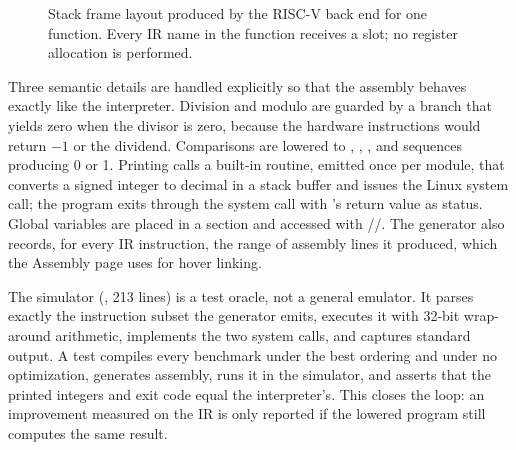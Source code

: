\begin{figure}[!htb]
\centering
{}
\caption[Stack frame layout produced by the RISC-V back end for one function.]{Stack frame layout produced by the RISC-V back end for one function. Every IR name in the function receives a slot; no register allocation is performed.}
\label{fig:frame}
\end{figure}

Three semantic details are handled explicitly so that the assembly behaves exactly like the interpreter. Division and modulo are guarded by a branch that yields zero when the divisor is zero, because the hardware instructions would return $-1$ or the dividend. Comparisons are lowered to , , , and  sequences producing 0 or 1. Printing calls a built-in  routine, emitted once per module, that converts a signed integer to decimal in a stack buffer and issues the Linux  system call; the program exits through the  system call with 's return value as status. Global variables are placed in a  section and accessed with //. The generator also records, for every IR instruction, the range of assembly lines it produced, which the Assembly page uses for hover linking.

The simulator (, 213 lines) is a test oracle, not a general emulator. It parses exactly the instruction subset the generator emits, executes it with 32-bit wrap-around arithmetic, implements the two system calls, and captures standard output. A test compiles every benchmark under the best ordering and under no optimization, generates assembly, runs it in the simulator, and asserts that the printed integers and exit code equal the interpreter's. This closes the loop: an improvement measured on the IR is only reported if the lowered program still computes the same result.

